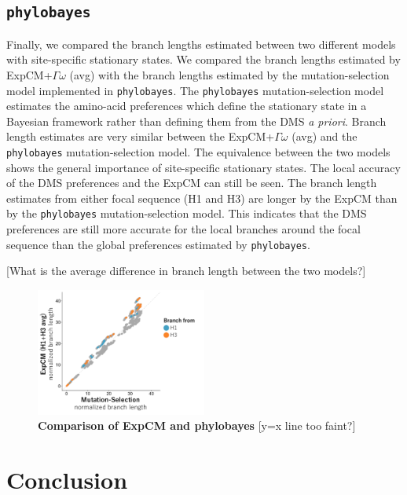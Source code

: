 \documentclass[11pt]{article}
\newcommand\skhcomment[1]{{\color{cyan}[#1]}}
\begin{document}
\subsection*{\texttt{phylobayes}}

Finally, we compared the branch lengths estimated between two different models with site-specific stationary states. 
We compared the branch lengths estimated by ExpCM+$\Gamma\omega$ (avg) with the branch lengths estimated by the mutation-selection model implemented in \texttt{phylobayes}. 
The \texttt{phylobayes} mutation-selection model estimates the amino-acid preferences which define the stationary state in a Bayesian framework rather than defining them from the DMS \textit{a priori}. 
Branch length estimates are very similar between the ExpCM+$\Gamma\omega$ (avg) and the \texttt{phylobayes} mutation-selection model. 
The equivalence between the two models shows the general importance of site-specific stationary states. 
The local accuracy of the DMS preferences and the ExpCM can still be seen. 
The branch length estimates from either focal sequence (H1 and H3) are longer by the ExpCM than by the \texttt{phylobayes} mutation-selection model. 
This indicates that the DMS preferences are still more accurate for the local branches around the focal sequence than the global preferences estimated by \texttt{phylobayes}. 

\skhcomment{What is the average difference in branch length between the two models?}

\begin{figure}[H]
\centerline{\includegraphics[width=0.5\textwidth]{figures/phylobayes.pdf}}
\caption{\label{fig:phylobayes}
\textbf{Comparison of ExpCM and phylobayes}
\skhcomment{y=x line too faint?}
}
\end{figure}

\section*{Conclusion}
\end{document}
